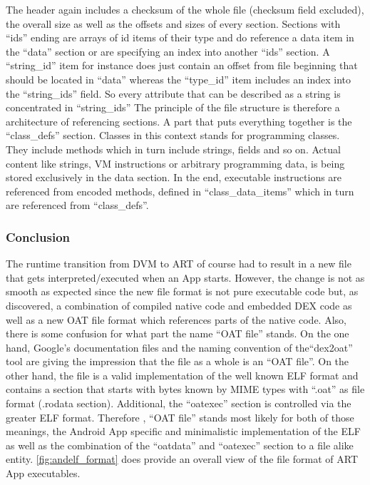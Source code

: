 The header again includes a checksum of the whole file (checksum
field excluded), the overall size as well as the offsets and sizes
of every section. Sections with ``ids'' ending are arrays of
id items of their type and do reference
a data item in the ``data'' section or are specifying
an index into another ``ids'' section. A ``string\_id'' item for
instance does just contain an offset from file beginning
that should be located in ``data'' whereas the ``type\_id'' item
includes an index into the ``string\_ids'' field. So every
attribute that can be described as a string is concentrated in ``string\_ids'' The principle of the file structure is therefore a architecture of referencing
sections. A part that puts everything together is the ``class\_defs''
section. Classes in this context stands for programming classes. They include methods which in turn include strings, fields and so on. Actual content like
strings, VM instructions or arbitrary programming data, is being stored exclusively in the data section. In the end, executable instructions are referenced from encoded methods, defined in ``class\_data\_items'' which in turn are referenced from ``class\_defs''.


\subsubsection{Conclusion}\label{section:andelf_format_conclusion}
The runtime transition from DVM to ART of course had to result
in a new file that gets interpreted/executed when an App starts.
However, the change is not as smooth as expected since
the new file format is not pure executable code but, as
discovered, a combination of compiled native code
and embedded DEX code as well as a new OAT file format
which references parts of the native code. Also, there is some
confusion for what part the name ``OAT file'' stands. On the
one hand, Google's documentation files and the naming
convention of the``dex2oat'' tool are giving the impression
that the file as a whole is an ``OAT file''. On
the other hand, the file is a valid implementation of the
well known ELF format and contains a section that starts
with bytes known by MIME types with ``.oat'' as file format
(.rodata section). Additional, the ``oatexec'' section
is controlled via the greater ELF format. Therefore
, ``OAT file'' stands most likely for both of those meanings, the
Android App specific and minimalistic implementation of the ELF
as well as the combination of the ``oatdata'' and ``oatexec''
section to a file alike entity. \autoref{fig:andelf_format} does
provide an overall view of the file format of ART App executables.

